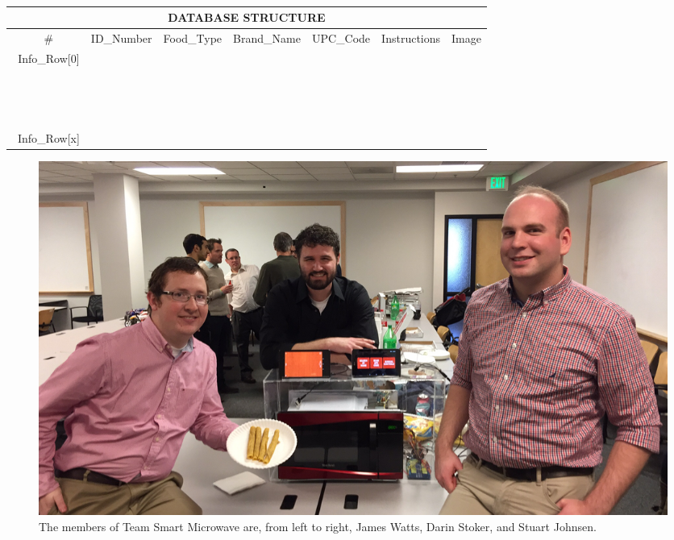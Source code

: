 \documentclass[10pt,journal,letterpaper,twocolumn]{IEEEtran}
\begin{document}
\begin{table}[h]
\centering
{
\begin{tabular}{| c | c | c | c | c | c | c |}
\hline
\multicolumn{7}{|c|}{DATABASE STRUCTURE}\\
\hline
\ \# & ID\_Number & Food\_Type & Brand\_Name & UPC\_Code & Instructions & Image \\
\hline
\ Info\_Row[0] & & & & & & \\
\hline
\ \dotfill & & & & & & \\
\hline
\ \dotfill & & & & & & \\
\hline
\ \dotfill & & & & & & \\
\hline
\  Info\_Row[x] & & & & & & \\
\hline
\end{tabular}
}
\caption{\label{tab:database}}
\end{table}

\begin{figure}[h]
\centering
\includegraphics[width=1.0\textwidth]{TeamPhoto.jpeg}
\caption{\label{fig:teamphoto}The members of Team Smart Microwave are, from left to right, James Watts, Darin Stoker, and Stuart Johnsen.}
\end{figure}
\end{document}
